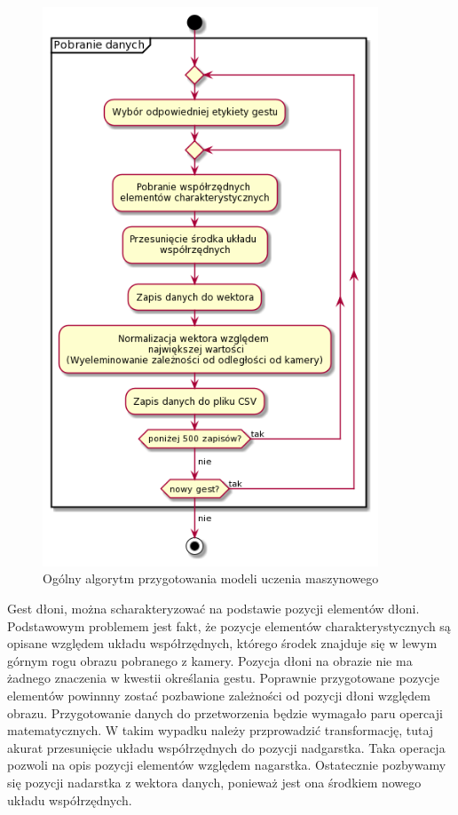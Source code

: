     \begin{figure}[H]
        \begin{center}
            \includegraphics[width=10cm]{../images/get_data.png}
            \caption{Ogólny algorytm przygotowania modeli uczenia maszynowego}
        \end{center}
    \end{figure}
    
    \quad Gest dłoni, można scharakteryzować na podstawie pozycji elementów dłoni. Podstawowym problemem jest fakt, że pozycje elementów charakterystycznych są opisane względem układu współrzędnych, którego środek znajduje się w lewym górnym rogu obrazu pobranego z kamery. Pozycja dłoni na obrazie nie ma żadnego znaczenia w kwestii określania gestu. Poprawnie przygotowane pozycje elementów powinnny zostać pozbawione zależności od pozycji dłoni względem obrazu. 
    \quad Przygotowanie danych do przetworzenia będzie wymagało paru opercaji matematycznych. W takim wypadku należy przprowadzić transformację, tutaj akurat przesunięcie układu współrzędnych do pozycji nadgarstka. Taka operacja pozwoli na opis pozycji elementów względem nagarstka. Ostatecznie pozbywamy się pozycji nadarstka z wektora danych, ponieważ jest ona środkiem nowego układu współrzędnych. 
    
